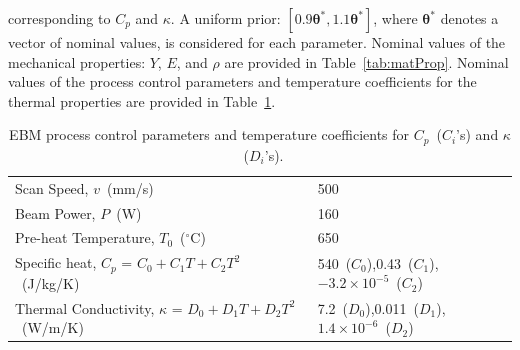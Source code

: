 corresponding to $C_p$ and $\kappa$. A uniform prior: $[0.9\bm{\theta}^\ast, 1.1\bm{\theta}^\ast]$, 
where $\bm{\theta}^\ast$ denotes a vector of nominal values,
is considered for each parameter. Nominal values of the mechanical properties: $Y$, $E$, and $\rho$ are provided
in Table~\ref{tab:matProp}. Nominal values of the process control parameters and temperature coefficients for
the thermal properties are provided in Table~\ref{tab:remain}.
%
\begin{table}[htbp]
\centering
\caption{EBM process control parameters and temperature coefficients for $C_p$~($C_i$'s) and $\kappa$~($D_i$'s).}
\label{tab:remain}
\vspace{1mm}
\begin{tabular}{ ll }
\toprule
Scan Speed, $v$~(mm/s) & 500 \\
Beam Power, $P$~(W) & 160 \\
Pre-heat Temperature, $T_0$~($^\circ$C) & 650 \\
Specific heat, $C_p$ = $C_0+C_1T+C_2T^2$~(J/kg/K) & 540~($C_0$),0.43~($C_1$),$-3.2\times 10^{-5}$~($C_2$) \\
Thermal Conductivity, $\kappa$ = $D_0+D_1T+D_2T^2$~(W/m/K) & 7.2~($D_0$),0.011~($D_1$),$1.4\times 10^{-6}$~($D_2$) \\
\bottomrule
\end{tabular}
\end{table}

